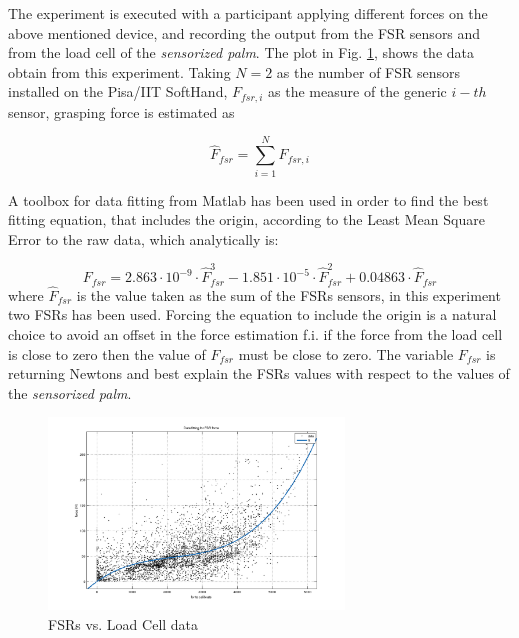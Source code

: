 The experiment is executed with a participant applying different forces on the above mentioned device, and recording the output from the FSR sensors and from the load cell of the \textit{sensorized palm}.
The plot in Fig. \ref{Fig:FSRcalibratedModel}, shows the data obtain from this experiment.
Taking $N=2$ as the number of FSR sensors installed on the Pisa/IIT SoftHand, $F_{fsr,i}$ as the measure of the generic $i-th$ sensor, grasping force is estimated as %

\begin{equation}
\hat{F}_{fsr} = \sum_{i=1}^{N} F_{fsr,i}
\label{EQ:sumofFSR}
\end{equation}

A toolbox for data fitting from Matlab has been used in order to find the best fitting equation, that includes the origin, according to the Least Mean Square Error to the raw data, which analytically is:

\begin{equation}
F_{fsr} = 2.863 \cdot 10^{-9}\cdot \hat{F}_{fsr}^3 - 1.851 \cdot 10^{-5} \cdot \hat{F}_{fsr}^2 + 0.04863 \cdot \hat{F}_{fsr} 
\label{EQ:fsrdummyfit}
\end{equation}
where $\hat{F}_{fsr}$ is the value taken as the sum of the FSRs sensors, in this experiment two FSRs has been used. Forcing the equation to include the origin is a natural choice to avoid an offset in the force estimation f.i. if the force from the load cell is close to zero then the value of $F_{fsr}$ must be close to zero.
The variable $F_{fsr}$ is returning Newtons and best explain the FSRs values with respect to the values of the \textit{sensorized palm}.

 
\begin{figure}[h]
\centering
\includegraphics[width=0.7\textwidth]{Figure/fsrtodummy.png}
\caption{FSRs vs. Load Cell data}
\label{Fig:FSRcalibratedModel}
\end{figure}

